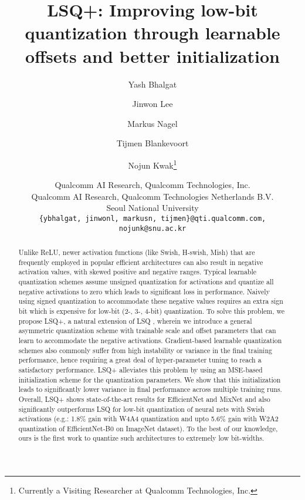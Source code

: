 \documentclass[10pt,twocolumn,letterpaper]{article}
\begin{document}
\title{LSQ+: Improving low-bit quantization through learnable offsets and better initialization}

\author{Yash Bhalgat\\
\and
Jinwon Lee\\
\and
Markus Nagel\\
\and
Tijmen Blankevoort\\
\and
Nojun Kwak\thanks{Currently a Visiting Researcher at Qualcomm Technologies, Inc.}\\
\and
Qualcomm AI Research, Qualcomm Technologies, Inc.\\
Qualcomm AI Research, Qualcomm Technologies Netherlands B.V.\\
Seoul National University\\
{\tt\small \{ybhalgat, jinwonl, markusn, tijmen\}@qti.qualcomm.com,  nojunk@snu.ac.kr}\\
}



\maketitle
\thispagestyle{empty}

\begin{abstract}
  Unlike ReLU, newer activation functions (like Swish, H-swish, Mish) that are frequently employed in popular efficient architectures can also result in negative activation values, with skewed positive and negative ranges. Typical learnable quantization schemes \cite{pact2018, lsq} assume unsigned quantization for activations and quantize all negative activations to zero which leads to significant loss in performance. Naively using signed quantization to accommodate these negative values requires an extra sign bit which is expensive for low-bit (2-, 3-, 4-bit) quantization. To solve this problem, we propose LSQ+, a natural extension of LSQ \cite{lsq}, wherein we introduce a general asymmetric quantization scheme with trainable scale and offset parameters that can learn to accommodate the negative activations. Gradient-based learnable quantization schemes also commonly suffer from high instability or variance in the final training performance, hence requiring a great deal of hyper-parameter tuning to reach a satisfactory performance. LSQ+ alleviates this problem by using an MSE-based initialization scheme for the quantization parameters. We show that this initialization leads to significantly lower variance in final performance across multiple training runs. Overall, LSQ+ shows state-of-the-art results for EfficientNet and MixNet and also significantly outperforms LSQ for low-bit quantization of neural nets with Swish activations (e.g.: 1.8\% gain with W4A4 quantization and upto 5.6\% gain with W2A2 quantization of EfficientNet-B0 on ImageNet dataset). To the best of our knowledge, ours is the first work to quantize such architectures to extremely low bit-widths. 


\end{abstract}
\end{document}
